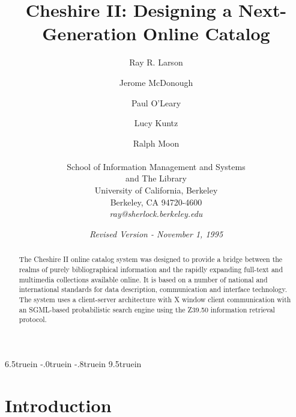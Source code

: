 



\textwidth 6.5truein
\oddsidemargin  -.0truein
\topmargin -.8truein
\textheight 9.5truein





\title{Cheshire II: Designing a Next-Generation Online Catalog}

\author{Ray R. Larson \and Jerome McDonough 
	\and Paul O'Leary \and Lucy Kuntz \and Ralph Moon\dag\\
	\\
        School of Information Management and Systems\\
	and The Library\dag\\
        University of California, Berkeley\\
        Berkeley, CA 94720-4600\\
	{\em ray@sherlock.berkeley.edu} }

\date{{\em Revised Version - November 1, 1995}}

{\small \maketitle} 

\begin{abstract} 
The Cheshire II online catalog system was designed to provide a bridge
between the realms of purely bibliographical information and the
rapidly expanding full-text and multimedia collections available online.
It is based on a number of national and international standards for
data description, communication and interface technology. The system
uses a client-server architecture with X window client communication
with an SGML-based probabilistic search engine using the Z39.50 
information retrieval protocol.
\end{abstract}

\newpage %
{}

\section{Introduction}

